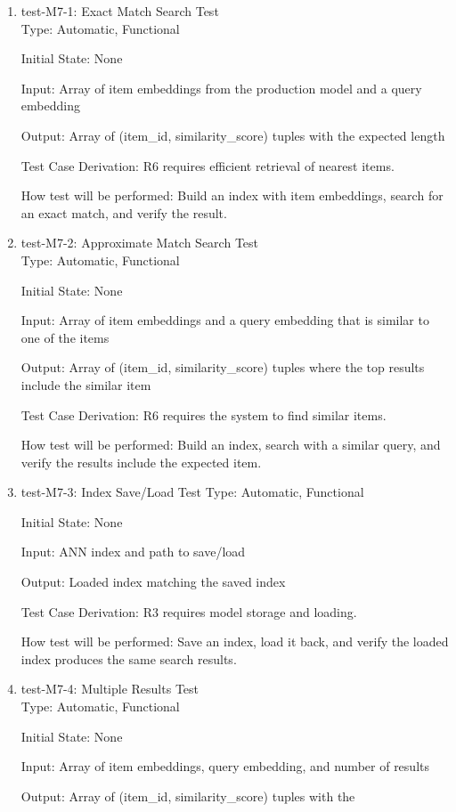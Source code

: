 \documentclass[12pt, titlepage]{article}
\begin{document}
\begin{enumerate}

\item{test-M7-1: Exact Match Search Test\\}
Type: Automatic, Functional
					
Initial State: None
					
Input: Array of item embeddings from the production model and a query embedding
					
Output: Array of (item\_id, similarity\_score) tuples with the expected length

Test Case Derivation: R6 requires efficient retrieval of nearest items.

How test will be performed: Build an index with item embeddings, search for an exact match, and verify the result.

\item{test-M7-2: Approximate Match Search Test\\}
Type: Automatic, Functional

Initial State: None

Input: Array of item embeddings and a query embedding that is similar to one of the items

Output: Array of (item\_id, similarity\_score) tuples where the top results include the similar item

Test Case Derivation: R6 requires the system to find similar items.

How test will be performed: Build an index, search with a similar query, and verify the results include the expected item.

\item{test-M7-3: Index Save/Load Test}
Type: Automatic, Functional

Initial State: None

Input: ANN index and path to save/load

Output: Loaded index matching the saved index

Test Case Derivation: R3 requires model storage and loading.

How test will be performed: Save an index, load it back, and verify the loaded index produces the same search results.

\item{test-M7-4: Multiple Results Test\\}
Type: Automatic, Functional

Initial State: None

Input: Array of item embeddings, query embedding, and number of results

Output: Array of (item\_id, similarity\_score) tuples with the 
\end{enumerate}
\end{document}
